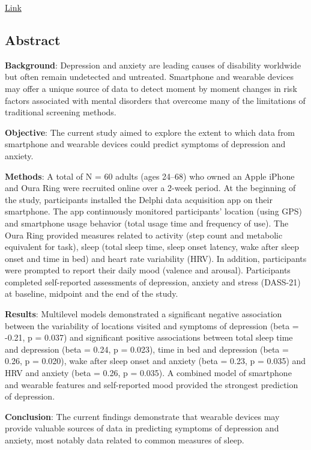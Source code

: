 \href{https://www.ncbi.nlm.nih.gov/pmc/articles/PMC7876288/}{Link}

\subsection{Abstract} 
\textbf{Background}: Depression and anxiety are leading causes of disability worldwide but often remain undetected and untreated. Smartphone and wearable devices may offer a unique source of data to detect moment by moment changes in risk factors associated with mental disorders that overcome many of the limitations of traditional screening methods.

\textbf{Objective}: The current study aimed to explore the extent to which data from smartphone and wearable devices could predict symptoms of depression and anxiety.

\textbf{Methods}: A total of N = 60 adults (ages 24–68) who owned an Apple iPhone and Oura Ring were recruited online over a 2-week period. At the beginning of the study, participants installed the Delphi data acquisition app on their smartphone. The app continuously monitored participants' location (using GPS) and smartphone usage behavior (total usage time and frequency of use). The Oura Ring provided measures related to activity (step count and metabolic equivalent for task), sleep (total sleep time, sleep onset latency, wake after sleep onset and time in bed) and heart rate variability (HRV). In addition, participants were prompted to report their daily mood (valence and arousal). Participants completed self-reported assessments of depression, anxiety and stress (DASS-21) at baseline, midpoint and the end of the study.

\textbf{Results}: Multilevel models demonstrated a significant negative association between the variability of locations visited and symptoms of depression (beta = -0.21, p = 0.037) and significant positive associations between total sleep time and depression (beta = 0.24, p = 0.023), time in bed and depression (beta = 0.26, p = 0.020), wake after sleep onset and anxiety (beta = 0.23, p = 0.035) and HRV and anxiety (beta = 0.26, p = 0.035). A combined model of smartphone and wearable features and self-reported mood provided the strongest prediction of depression.

\textbf{Conclusion}: The current findings demonstrate that wearable devices may provide valuable sources of data in predicting symptoms of depression and anxiety, most notably data related to common measures of sleep.

